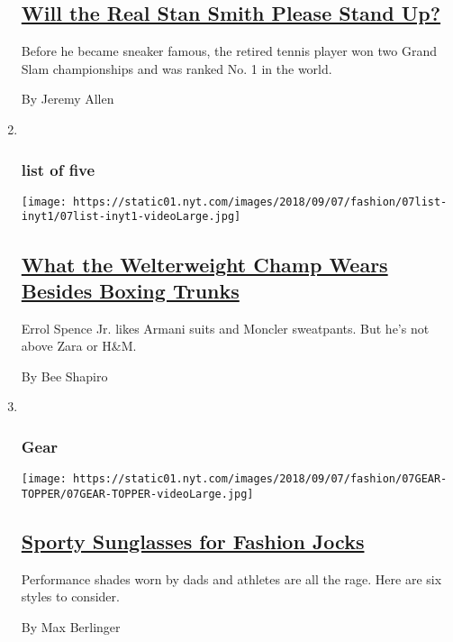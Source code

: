 \begin{enumerate}
  \hypertarget{will-the-real-stan-smith-please-stand-up}{%
  \subsection{\texorpdfstring{\href{/2018/09/06/fashion/mens-style/will-the-real-stan-smith-please-stand-up.html}{Will
  the Real Stan Smith Please Stand
  Up?}}{Will the Real Stan Smith Please Stand Up?}}\label{will-the-real-stan-smith-please-stand-up}}

  Before he became sneaker famous, the retired tennis player won two
  Grand Slam championships and was ranked No. 1 in the world.

  By Jeremy Allen
\item ~
  \hypertarget{list-of-five-1}{%
  \subsubsection{list of five}\label{list-of-five-1}}

  \texttt{[image: https://static01.nyt.com/images/2018/09/07/fashion/07list-inyt1/07list-inyt1-videoLarge.jpg]}

  \hypertarget{what-the-welterweight-champ-wears-besides-boxing-trunks}{%
  \subsection{\texorpdfstring{\href{/2018/09/04/fashion/mens-style/errol-spence-jr-boxing-style.html}{What
  the Welterweight Champ Wears Besides Boxing
  Trunks}}{What the Welterweight Champ Wears Besides Boxing Trunks}}\label{what-the-welterweight-champ-wears-besides-boxing-trunks}}

  Errol Spence Jr. likes Armani suits and Moncler sweatpants. But he's
  not above Zara or H\&M.

  By Bee Shapiro
\item ~
  \hypertarget{gear}{%
  \subsubsection{Gear}\label{gear}}

  \texttt{[image: https://static01.nyt.com/images/2018/09/07/fashion/07GEAR-TOPPER/07GEAR-TOPPER-videoLarge.jpg]}

  \hypertarget{sporty-sunglasses-for-fashion-jocks}{%
  \subsection{\texorpdfstring{\href{/2018/09/05/fashion/mens-style/sporty-sunglasses-for-fashion-jocks.html}{Sporty
  Sunglasses for Fashion
  Jocks}}{Sporty Sunglasses for Fashion Jocks}}\label{sporty-sunglasses-for-fashion-jocks}}

  Performance shades worn by dads and athletes are all the rage. Here
  are six styles to consider.

  By Max Berlinger
\end{enumerate}

